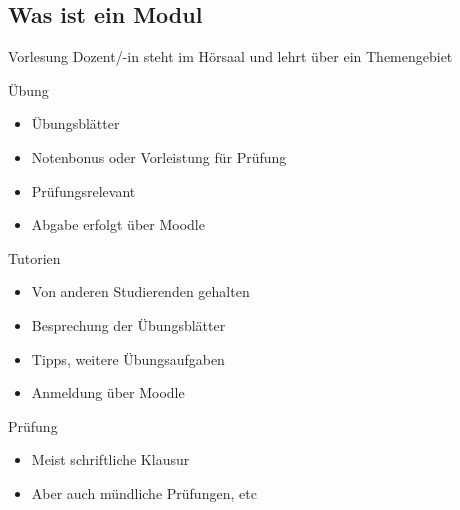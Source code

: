 \documentclass[
	aspectratio=169, 
	10pt 
]{beamer}
\begin{document}
\subsection{Was ist ein Modul}
\begin{frame}{\insertsubsection}
    \begin{fancycolumns}[columns=2]
        \begin{definition}{Vorlesung}
            Dozent/-in steht im Hörsaal und lehrt über ein Themengebiet
        \end{definition}
        
        \begin{definition}{Übung}
            \begin{itemize}
                \item Übungsblätter
                \item Notenbonus oder Vorleistung für Prüfung
                \item Prüfungsrelevant
                \item Abgabe erfolgt über Moodle
            \end{itemize}
        \end{definition}
        
        \nextcolumn
        \begin{definition}{Tutorien}
            \begin{itemize}
                \item Von anderen Studierenden gehalten
                \item Besprechung der Übungsblätter 
                \item Tipps, weitere Übungsaufgaben
                \item Anmeldung über Moodle
            \end{itemize}
        \end{definition}

        \begin{definition}{Prüfung}
            \begin{itemize}
                \item Meist schriftliche Klausur
                \item Aber auch mündliche Prüfungen, etc
            \end{itemize}
        \end{definition}

    \end{fancycolumns}
\end{frame}
\end{document}
